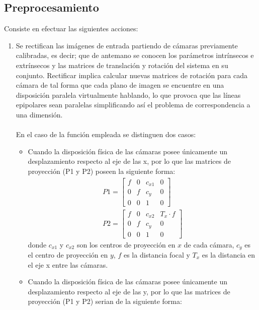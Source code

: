 \subsection{Preprocesamiento}
Consiste en efectuar las siguientes acciones:
\begin{enumerate}
    \item Se rectifican las imágenes de entrada partiendo de cámaras previamente calibradas, es decir; que de antemano se conocen los parámetros intrínsecos e extrínsecos y las matrices de translación y rotación del sistema en su conjunto. Rectificar implica calcular nuevas matrices de rotación para cada cámara de tal forma que cada plano de imagen se encuentre en una disposición paralela virtualmente hablando, lo que provoca que las líneas epipolares sean paralelas simplificando así el problema de correspondencia a una dimensión.
    \\
    \\
    En el caso de la función empleada se distinguen dos casos:
    \begin{itemize}
        \item Cuando la disposición física de las cámaras posee únicamente un desplazamiento respecto al eje de las x, por lo que las matrices de proyección (P1 y P2) poseen la siguiente forma:
        \begin{align}
           P1 = \begin{bmatrix}
            f & 0 & c_{x1} & 0\\
            0 & f & c_{y} & 0\\
            0 & 0 & 1 & 0
            \end{bmatrix}\\
            P2 = \begin{bmatrix}
             f & 0 & c_{x2} & T_{x} \cdot f\\
            0 & f & c_{y} & 0\\
            0 & 0 & 1 & 0
            \end{bmatrix}
        \end{align}
        donde $c_{x1}$ y $c_{x2}$ son los centros de proyección en $x$ de cada cámara, $c_{y}$ es el centro de proyección en $y$, $f$ es la distancia focal y $T_{x}$ es la distancia en el eje x entre las cámaras.
        \item Cuando la disposición física de las cámaras posee únicamente un desplazamiento respecto al eje de las y, por lo que las matrices de proyección (P1 y P2) serian de la siguiente forma:
        \begin{align}

\end{align}
\end{itemize}
\end{enumerate}
